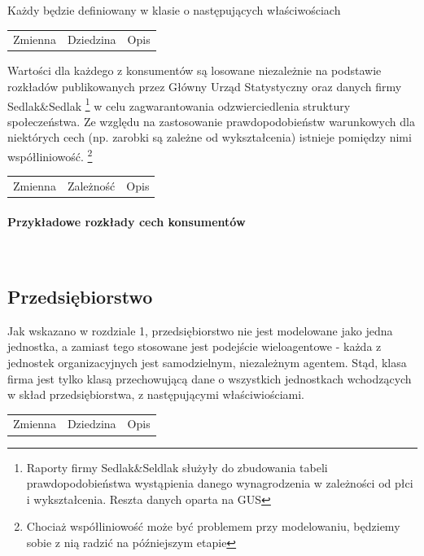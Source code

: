 \documentclass{article}
\begin{document}
Każdy będzie definiowany w klasie o następujących właściwościach 

\begin{center}
\begin{tabular}{ c c c }
Zmienna & Dziedzina & Opis \\ 
\end{tabular}
\end{center}

Wartości dla każdego z konsumentów są losowane niezależnie na podstawie rozkładów publikowanych przez Główny Urząd Statystyczny oraz danych firmy Sedlak\&Sedlak \footnote{Raporty firmy Sedlak\&Seldlak służyły do zbudowania tabeli prawdopodobieństwa wystąpienia danego wynagrodzenia w zależności od płci i wykształcenia. Reszta danych oparta na GUS} w celu zagwarantowania odzwierciedlenia struktury społeczeństwa. Ze względu na zastosowanie prawdopodobieństw warunkowych dla niektórych cech (np. zarobki są zależne od wykształcenia) istnieje pomiędzy nimi współliniowość. \footnote{Chociaż współliniowość może być problemem przy modelowaniu, będziemy sobie z nią radzić na późniejszym etapie}

\begin{center}
\begin{tabular}{ c c c }
Zmienna & Zależność & Opis \\ 
\end{tabular}
\end{center}

\paragraph{Przykładowe rozkłady cech konsumentów} \mbox{}\\

\subsection{Przedsiębiorstwo}

Jak wskazano w rozdziale 1, przedsiębiorstwo nie jest modelowane jako jedna jednostka, a zamiast tego stosowane jest podejście wieloagentowe - każda z jednostek organizacyjnych jest samodzielnym, niezależnym agentem. Stąd, klasa firma jest tylko klasą przechowującą dane o wszystkich jednostkach wchodzących w skład przedsiębiorstwa, z następującymi właściwiościami.

\begin{center}
\begin{tabular}{ c c c }
Zmienna & Dziedzina & Opis \\ 
\end{tabular}
\end{center}
\end{document}
